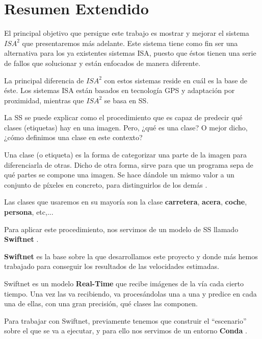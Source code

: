 \chapter{Resumen Extendido}

El principal objetivo que persigue este trabajo es mostrar y mejorar el sistema $ISA^{2}$ que presentaremos más adelante. Este sistema tiene como fin ser una alternativa para los ya existentes sistemas \ac{ISA}, puesto que éstos tienen una serie de fallos que solucionar y están enfocados de manera diferente.

La principal diferencia de $ISA^{2}$ con estos sistemas reside en cuál es la base de éste. Los sistemas \ac{ISA} están basados en tecnología \ac{GPS} y adaptación por proximidad, mientras que $ISA^{2}$ se basa en \ac{SS}.

La \ac{SS} se puede explicar como el procedimiento que es capaz de predecir qué clases (etiquetas) hay en una imagen. Pero, ¿qué es una clase? O mejor dicho, ¿cómo definimos una clase en este contexto?

Una clase (o etiqueta) es la forma de categorizar una parte de la imagen para diferenciarla de otras. Dicho de otra forma, sirve para que un programa sepa de qué partes se compone una imagen. Se hace dándole un mismo valor a un conjunto de píxeles en concreto, para distinguirlos de los demás \cite{deeplab}.

Las clases que usaremos en su mayoría son la clase \textbf{carretera}, \textbf{acera}, \textbf{coche}, \textbf{persona}, etc,...

Para aplicar este procedimiento, nos servimos de un modelo de \ac{SS} llamado \textbf{Swiftnet} \cite{swiftnet}.

\textbf{Swiftnet} es la base sobre la que desarrollamos este proyecto y donde más hemos trabajado para conseguir los resultados de las velocidades estimadas.

Swiftnet es un modelo \textbf{Real-Time} que recibe imágenes de la vía cada cierto tiempo. Una vez las va recibiendo, va procesándolas una a una y predice en cada una de ellas, con una gran precisión, qué clases las componen.

Para trabajar con Swiftnet, previamente tenemos que construir el ``escenario'' sobre el que se va a ejecutar, y para ello nos servimos de un entorno \textbf{Conda} \cite{conda}.

